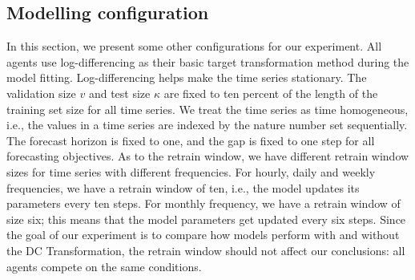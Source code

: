 \subsection{Modelling configuration}
In this section, we present some other configurations for our experiment. All agents use log-differencing as their basic target transformation method during the model fitting. Log-differencing helps make the time series stationary. The validation size $v$ and test size $\kappa$ are fixed to ten percent of the length of the training set size for all time series. We treat the time series as time homogeneous, i.e., the values in a time series are indexed by the nature number set sequentially. The forecast horizon is fixed to one, and the gap is fixed to one step for all forecasting objectives. As to the retrain window, we have different retrain window sizes for time series with different frequencies. For hourly, daily and weekly frequencies, we have a retrain window of ten, i.e., the model updates its parameters every ten steps. For monthly frequency, we have a retrain window of size six; this means that the model parameters get updated every six steps. Since the goal of our experiment is to compare how models perform with and without the DC Transformation, the retrain window should not affect our conclusions: all agents compete on the same conditions.

